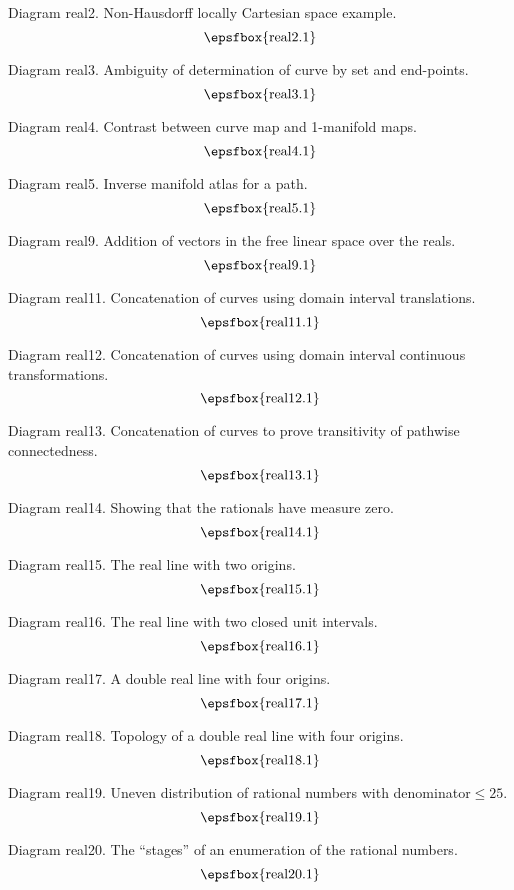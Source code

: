 Diagram real2. Non-Hausdorff locally Cartesian space example.
$$
\centerline{\epsfbox{real2.1}}
$$

Diagram real3. Ambiguity of determination of curve by set and end-points.
$$
\centerline{\epsfbox{real3.1}}
$$

Diagram real4. Contrast between curve map and 1-manifold maps.
$$
\centerline{\epsfbox{real4.1}}
$$

\filleject

Diagram real5. Inverse manifold atlas for a path.
$$
\centerline{\epsfbox{real5.1}}
$$

Diagram real9. Addition of vectors in the free linear space over the reals.
$$
\centerline{\epsfbox{real9.1}}
$$

Diagram real11. Concatenation of curves using domain interval translations.
$$
\centerline{\epsfbox{real11.1}}
$$

\filleject

Diagram real12. Concatenation of curves using domain interval continuous
transformations.
$$
\centerline{\epsfbox{real12.1}}
$$

Diagram real13. Concatenation of curves to prove transitivity of pathwise
connectedness.
$$
\centerline{\epsfbox{real13.1}}
$$

Diagram real14. Showing that the rationals have measure zero.
$$
\centerline{\epsfbox{real14.1}}
$$

Diagram real15. The real line with two origins.
$$
\centerline{\epsfbox{real15.1}}
$$

\filleject

Diagram real16. The real line with two closed unit intervals.
$$
\centerline{\epsfbox{real16.1}}
$$

Diagram real17. A double real line with four origins.
$$
\centerline{\epsfbox{real17.1}}
$$

Diagram real18. Topology of a double real line with four origins.
$$
\centerline{\epsfbox{real18.1}}
$$

Diagram real19. Uneven distribution of rational numbers with
denominator${}\le25$.
$$
\centerline{\epsfbox{real19.1}}
$$

Diagram real20. The ``stages'' of an enumeration of the rational numbers.
$$
\centerline{\epsfbox{real20.1}}
$$

